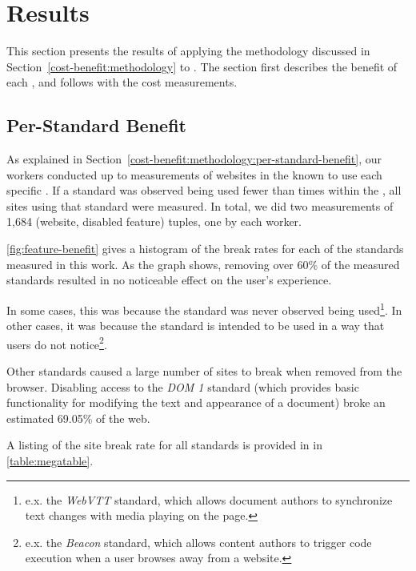 \section{Results}
\label{cost-benefit:results}

This section presents the results of applying the methodology discussed in
Section~\ref{cost-benefit:methodology} to \FFWithVersion.  The section first describes
the benefit of each \WAS, and follows with the cost measurements.



\subsection{Per-Standard Benefit}
\label{cost-benefit:results:results-benefit}



As explained in Section~\ref{cost-benefit:methodology:per-standard-benefit}, our workers
conducted up to \NumSitesPerStandard measurements of websites in the \ATK known
to use each specific \WAS. If a standard was observed being used fewer than
\NumSitesPerStandard times within the \ATK, all sites using that standard were
measured. In total, we did two measurements of 1,684 (website, disabled feature)
tuples, one by each worker.

\ref{fig:feature-benefit} gives a histogram of the break rates for each of
the \NumStandards standards measured in this work.  As the graph shows, removing
over 60\% of the measured standards resulted in no noticeable effect on the
user's experience.

In some cases, this was because the standard was never observed being
used\footnote{e.x. the \textit{WebVTT} standard, which allows document
authors to synchronize text changes with media playing on the page.}.
In other cases, it was because the standard is intended to be used in a way
that users do not notice\footnote{e.x. the \textit{Beacon} standard, which allows content
authors to trigger code execution when a user browses away from a website.}.

Other standards caused a large number of sites to break when removed
from the browser.  Disabling access to the \textit{DOM 1} standard (which provides
basic functionality for modifying the text and appearance of a document)
broke an estimated 69.05\% of the web.

A listing of the site break rate for all \NumStandards standards is provided in
in \ref{table:megatable}.

